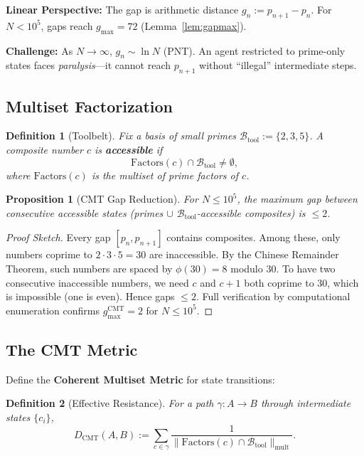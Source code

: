 \documentclass[12pt,a4paper]{article}
\newtheorem{proposition}[theorem]{Proposition}
\newtheorem{definition}{Definition}[section]
\begin{document}
\textbf{Linear Perspective:} The gap is arithmetic distance $g_n := p_{n+1} - p_n$. For $N < 10^5$, gaps reach $g_{\max} = 72$ (Lemma~\ref{lem:gapmax}).

\textbf{Challenge:} As $N \to \infty$, $g_n \sim \ln N$ (PNT). An agent restricted to prime-only states faces \textit{paralysis}—it cannot reach $p_{n+1}$ without ``illegal'' intermediate steps.

\subsection{Multiset Factorization}

\begin{definition}[Toolbelt]
Fix a basis of small primes $\mathcal{B}_{\text{tool}} := \{2, 3, 5\}$. A composite number $c$ is \textbf{accessible} if
\[
\text{Factors}(c) \cap \mathcal{B}_{\text{tool}} \neq \emptyset,
\]
where $\text{Factors}(c)$ is the multiset of prime factors of $c$.
\end{definition}

\begin{proposition}[CMT Gap Reduction]
\label{prop:cmtgap}
For $N \le 10^5$, the maximum gap between consecutive accessible states (primes $\cup$ $\mathcal{B}_{\text{tool}}$-accessible composites) is $\le 2$.
\end{proposition}

\begin{proof}[Proof Sketch]
Every gap $[p_n, p_{n+1}]$ contains composites. Among these, only numbers coprime to $2 \cdot 3 \cdot 5 = 30$ are inaccessible. By the Chinese Remainder Theorem, such numbers are spaced by $\phi(30) = 8$ modulo 30. To have two consecutive inaccessible numbers, we need $c$ and $c+1$ both coprime to 30, which is impossible (one is even). Hence gaps $\le 2$. Full verification by computational enumeration confirms $g_{\max}^{\text{CMT}} = 2$ for $N \le 10^5$.
\end{proof}

\subsection{The CMT Metric}

Define the \textbf{Coherent Multiset Metric} for state transitions:

\begin{definition}[Effective Resistance]
For a path $\gamma: A \to B$ through intermediate states $\{c_i\}$,
\[
D_{\text{CMT}}(A, B) := \sum_{c \in \gamma} \frac{1}{\|\text{Factors}(c) \cap \mathcal{B}_{\text{tool}}\|_{\text{mult}}}.
\]
\end{definition}
\end{document}

